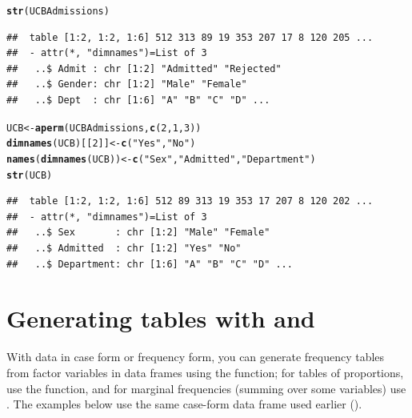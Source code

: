\documentclass[11pt]{book}\usepackage[]{graphicx}\usepackage[]{color}
\makeatletter
\newcommand{\hlnum}[1]{\textcolor[rgb]{0.686,0.059,0.569}{#1}}%
\newcommand{\hlstr}[1]{\textcolor[rgb]{0.192,0.494,0.8}{#1}}%
\newcommand{\hlstd}[1]{\textcolor[rgb]{0.345,0.345,0.345}{#1}}%
\newcommand{\hlkwb}[1]{\textcolor[rgb]{0.69,0.353,0.396}{#1}}%
\newcommand{\hlkwd}[1]{\textcolor[rgb]{0.737,0.353,0.396}{\textbf{#1}}}%
\newenvironment{kframe}{%
 \def\at@end@of@kframe{}%
 \ifinner\ifhmode%
  \def\at@end@of@kframe{\end{minipage}}%
  \begin{minipage}{\columnwidth}%
 \fi\fi%
 \def\FrameCommand##1{\hskip\@totalleftmargin \hskip-\fboxsep
 \colorbox{shadecolor}{##1}\hskip-\fboxsep
     \hskip-\linewidth \hskip-\@totalleftmargin \hskip\columnwidth}%
 \MakeFramed {\advance\hsize-\width
   \@totalleftmargin\z@ \linewidth\hsize
   \@setminipage}}%
 {\par\unskip\endMakeFramed%
 \at@end@of@kframe}
\newenvironment{knitrout}{}{} %
\renewenvironment{knitrout}{\small\renewcommand{\baselinestretch}{.85}}{} %
\makeatother
\begin{document}
\begin{knitrout}
\color{fgcolor}\begin{kframe}
\begin{alltt}
\hlkwd{str}\hlstd{(UCBAdmissions)}
\end{alltt}
\begin{verbatim}
##  table [1:2, 1:2, 1:6] 512 313 89 19 353 207 17 8 120 205 ...
##  - attr(*, "dimnames")=List of 3
##   ..$ Admit : chr [1:2] "Admitted" "Rejected"
##   ..$ Gender: chr [1:2] "Male" "Female"
##   ..$ Dept  : chr [1:6] "A" "B" "C" "D" ...
\end{verbatim}
\begin{alltt}
\hlstd{UCB} \hlkwb{<-} \hlkwd{aperm}\hlstd{(UCBAdmissions,} \hlkwd{c}\hlstd{(}\hlnum{2}\hlstd{,} \hlnum{1}\hlstd{,} \hlnum{3}\hlstd{))}
\hlkwd{dimnames}\hlstd{(UCB)[[}\hlnum{2}\hlstd{]]} \hlkwb{<-} \hlkwd{c}\hlstd{(}\hlstr{"Yes"}\hlstd{,} \hlstr{"No"}\hlstd{)}
\hlkwd{names}\hlstd{(}\hlkwd{dimnames}\hlstd{(UCB))} \hlkwb{<-} \hlkwd{c}\hlstd{(}\hlstr{"Sex"}\hlstd{,} \hlstr{"Admitted"}\hlstd{,} \hlstr{"Department"}\hlstd{)}
\hlkwd{str}\hlstd{(UCB)}
\end{alltt}
\begin{verbatim}
##  table [1:2, 1:2, 1:6] 512 89 313 19 353 17 207 8 120 202 ...
##  - attr(*, "dimnames")=List of 3
##   ..$ Sex       : chr [1:2] "Male" "Female"
##   ..$ Admitted  : chr [1:2] "Yes" "No"
##   ..$ Department: chr [1:6] "A" "B" "C" "D" ...
\end{verbatim}
\end{kframe}
\end{knitrout}



\section[Generating tables: table and xtabs]{Generating tables with  and }\label{sec:table}

With data in case form or frequency form,
you  can  generate frequency  tables from factor variables in data frames 
using the   function; for  tables  of
proportions,  use  the  function,  and for marginal  frequencies
(summing over some variables) use .  The examples below 
use the same case-form data frame  used earlier ().
\end{document}
